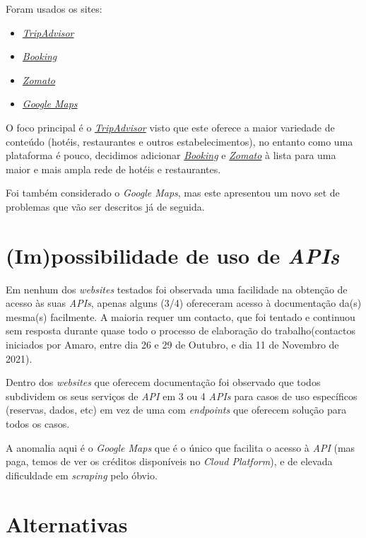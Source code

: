 Foram usados os sites:
\begin{itemize}
  \item \textit{\href{https://www.tripadvisor.com/}{TripAdvisor}}
  \item \textit{\href{https://www.booking.com/}{Booking}}
  \item \textit{\href{https://www.zomato.com/}{Zomato}}
  \item \textit{\href{https://developers.google.com/maps}{Google Maps}}
\end{itemize}

O foco principal é o \textit{\href{https://www.tripadvisor.com/}{TripAdvisor}} visto que este oferece a maior variedade de conteúdo (hotéis, restaurantes e outros estabelecimentos), no entanto como uma plataforma é pouco, decidimos adicionar \textit{\href{https://www.booking.com/}{Booking}} e \textit{\href{https://www.zomato.com/}{Zomato}} à lista para uma maior e mais ampla rede de hotéis e restaurantes.

Foi também considerado o \textit{Google Maps}, mas este apresentou um novo set de problemas que vão ser descritos já de seguida.

\section{(Im)possibilidade de uso de \textit{APIs}}

Em nenhum dos \textit{websites} testados foi observada uma facilidade na obtenção de acesso às suas \textit{APIs}, apenas alguns (3/4) ofereceram acesso à documentação da(s) mesma(s) facilmente. A maioria requer um contacto, que foi tentado e continuou sem resposta durante quase todo o processo de elaboração do trabalho(contactos iniciados por Amaro, entre dia 26 e 29 de Outubro, e dia 11 de Novembro de 2021).

Dentro dos \textit{websites} que oferecem documentação foi observado que todos subdividem os seus serviços de \textit{API} em 3 ou 4 \textit{APIs} para casos de uso específicos (reservas, dados, etc) em vez de uma com \textit{endpoints} que oferecem solução para todos os casos.

A anomalia aqui é o \textit{Google Maps} que é o único que facilita o acesso à \textit{API} (mas paga, temos de ver os créditos disponíveis no \textit{Cloud Platform}), e de elevada dificuldade em \textit{scraping} pelo óbvio.

\section{Alternativas}

